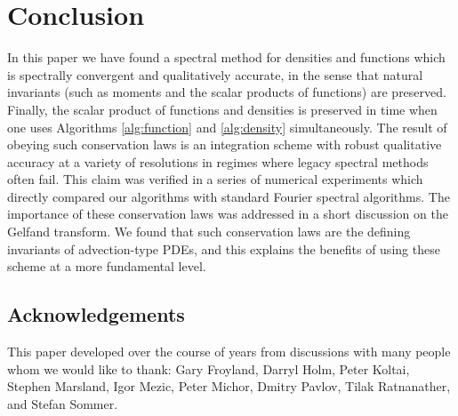 \documentclass[final,leqno]{siamltex1213}
\begin{document}
\section{Conclusion}

In this paper we have found a spectral method for densities and functions which is spectrally convergent
and qualitatively accurate, in the sense that natural invariants (such as moments and the scalar products of functions) are preserved.
Finally, the scalar product of functions and densities is preserved in time when one uses Algorithms \ref{alg:function} and \ref{alg:density} simultaneously.
The result of obeying such conservation laws is an integration scheme with robust qualitative accuracy at a variety of resolutions in regimes where legacy spectral methods often fail.
This claim was verified in a series of numerical experiments which directly compared our algorithms with standard Fourier spectral algorithms.
The importance of these conservation laws was addressed in a short discussion on the Gelfand transform.
We found that such conservation laws are the defining invariants of advection-type PDEs, and this explains the benefits of using these scheme at a more fundamental level.


\subsection{Acknowledgements}
This paper developed over the course of years from discussions with many people whom we would like to thank: Gary Froyland,
 	Darryl Holm, Peter Koltai, Stephen Marsland, Igor Mezic, Peter Michor, Dmitry Pavlov, Tilak Ratnanather, and Stefan Sommer.
\end{document}
